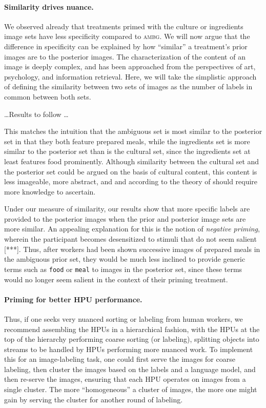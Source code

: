 \documentclass[a4paper]{report}
\begin{document}
\paragraph{Similarity drives nuance.}
We observed already that treatments primed with the 
culture or ingredients image sets have less specificity compared to 
\textsc{ambg}.  We will now argue that the difference in specificity
can be explained by how ``similar'' a treatment's prior 
images are to the posterior images. The characterization of the content of an 
image is deeply complex, and has been approached from the perspectives of art\cite{panofsky1939studies,shatford1986analyzing},
psychology\cite{Tversky1977327}, and information retrieval\cite{Jaimes20002}.  Here, we will take the simplistic 
approach of defining the similarity between two sets of images as the number of
labels in common between both sets.

\dots Results to follow \dots

This matches the intuition that the ambiguous set is most similar to the 
posterior set in that they both feature prepared meals, while the ingredients
set is more similar to the posterior set than is the cultural set, since the
ingredients set at least features food prominently.  Although similarity 
between the cultural set and the posterior set could be argued on the basis
of cultural content, this content is less imageable, more abstract, and
and according to the theory of \cite{Jaimes20002} should require more 
knowledge to ascertain.

Under our measure of similarity, our results show that
more specific labels are provided to the posterior images when the prior and
posterior image sets are more similar.
An appealing explanation for 
this is the notion of \textit{negative priming}, wherein the participant
becomes desensitized to stimuli that do not seem salient [***].  Thus, after 
workers had been shown successive images of prepared meals in the ambiguous
prior set, they would be much less inclined to provide generic terms such as 
\texttt{food} or 
\texttt{meal} to images in the posterior set, since these terms would no 
longer seem salient in the 
context of their priming treatment.  

\paragraph{Priming for better HPU performance.}
Thus, if one seeks very nuanced sorting or labeling from human workers, 
we recommend assembling the HPUs in a hierarchical fashion, with the 
HPUs at the top of the hierarchy performing coarse sorting (or labeling), 
splitting objects into streams to be handled by HPUs performing more nuanced 
work.  To implement this for an
image-labeling task, one could first serve the images for coarse labeling,
then cluster the images based on the labels and a language model, and then 
re-serve the images, ensuring that each HPU operates on images from a single 
cluster.  The more ``homogeneous'' a cluster of images, the more one might gain
by serving the cluster for another round of labeling.
\end{document}
